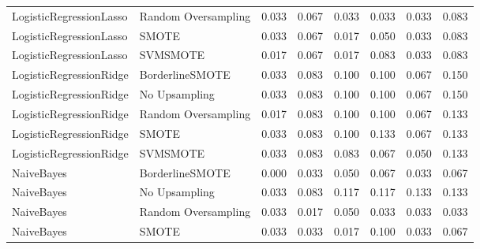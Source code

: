 \begin{tabular}{llllllll}
     LogisticRegressionLasso & Random Oversampling & 0.033 &                     0.067 &                 0.033 &                  0.033 &                                   0.033 &    0.083 \\
     LogisticRegressionLasso &               SMOTE & 0.033 &                     0.067 &                 0.017 &                  0.050 &                                   0.033 &    0.083 \\
     LogisticRegressionLasso &            SVMSMOTE & 0.017 &                     0.067 &                 0.017 &                  0.083 &                                   0.033 &    0.083 \\
     LogisticRegressionRidge &     BorderlineSMOTE & 0.033 &                     0.083 &                 0.100 &                  0.100 &                                   0.067 &    0.150 \\
     LogisticRegressionRidge &       No Upsampling & 0.033 &                     0.083 &                 0.100 &                  0.100 &                                   0.067 &    0.150 \\
     LogisticRegressionRidge & Random Oversampling & 0.017 &                     0.083 &                 0.100 &                  0.100 &                                   0.067 &    0.133 \\
     LogisticRegressionRidge &               SMOTE & 0.033 &                     0.083 &                 0.100 &                  0.133 &                                   0.067 &    0.133 \\
     LogisticRegressionRidge &            SVMSMOTE & 0.033 &                     0.083 &                 0.083 &                  0.067 &                                   0.050 &    0.133 \\
                  NaiveBayes &     BorderlineSMOTE & 0.000 &                     0.033 &                 0.050 &                  0.067 &                                   0.033 &    0.067 \\
                  NaiveBayes &       No Upsampling & 0.033 &                     0.083 &                 0.117 &                  0.117 &                                   0.133 &    0.133 \\
                  NaiveBayes & Random Oversampling & 0.033 &                     0.017 &                 0.050 &                  0.033 &                                   0.033 &    0.033 \\
                  NaiveBayes &               SMOTE & 0.033 &                     0.033 &                 0.017 &                  0.100 &                                   0.033 &    0.067 \\

\end{tabular}
